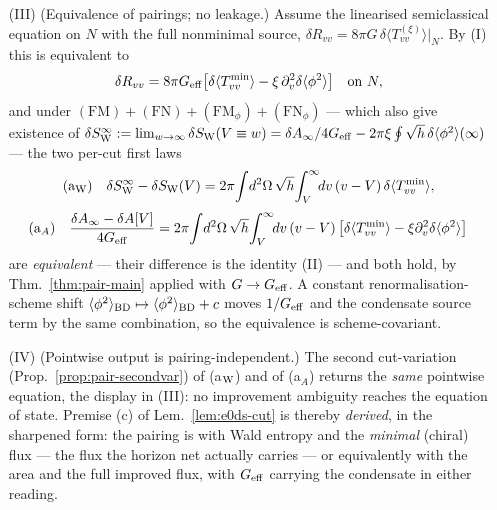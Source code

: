 \begin{lemma}
\begin{enumerate}
vanishing weight, the far term is killed by
$(\mathrm{FM}_{\phi})+(\mathrm{FN}_{\phi})$. The improvement
contribution to the weighted flux,
$2\pi\xi\oint\sqrt h\,[\delta\langle\phi^{2}\rangle(\infty)
-\delta\langle\phi^{2}\rangle(V)]$, is therefore cut-localised ---
nothing is left on the horizon bulk --- and cancels \emph{exactly}
against the $\xi$-piece of the Wald-entropy deficit,
$\delta S^{(\xi)}(\infty)-\delta S^{(\xi)}(V)
=2\pi\xi\oint\sqrt h\,[\delta\langle\phi^{2}\rangle(V)
-\delta\langle\phi^{2}\rangle(\infty)]$ with
$\delta S^{(\xi)}(V):=-2\pi\xi\oint\sqrt h\,\delta\langle\phi^{2}
\rangle(V)$, when moved across the first law: this is the improvement-identity
surface-term statement, made sign-explicit.
\item[(III)] (Equivalence of pairings; no leakage.) Assume the
linearised semiclassical equation on $N$ with the full nonminimal
source, $\delta R_{vv}=8\pi G\,\delta\langle T^{(\xi)}_{vv}\rangle
|_{N}$. By (I) this is equivalent to
\[
\delta R_{vv}
=8\pi G_{\rm eff}\bigl[\delta\langle T^{\rm min}_{vv}\rangle
-\xi\,\partial_{v}^{2}\delta\langle\phi^{2}\rangle\bigr]\quad
\text{on }N,
\]
and under $(\mathrm{FM})+(\mathrm{FN})+(\mathrm{FM}_{\phi})
+(\mathrm{FN}_{\phi})$ --- which also give existence of
$\delta S_{\rm W}^{\infty}:=\lim_{w\to\infty}\delta S_{\rm W}
(V\equiv w)=\delta A_{\infty}/4G_{\rm eff}-2\pi\xi\oint\sqrt h\,
\delta\langle\phi^{2}\rangle(\infty)$ --- the two per-cut first laws
\[
\text{(a$_{\rm W}$)}\quad
\delta S_{\rm W}^{\infty}-\delta S_{\rm W}(V)
=2\pi\!\int\!d^{2}\Omega\,\sqrt h\!\int_{V}^{\infty}\!\!dv\,(v-V)\,
\delta\langle T^{\rm min}_{vv}\rangle,
\]
\[
\text{(a$_{A}$)}\quad
\frac{\delta A_{\infty}-\delta A[V]}{4G_{\rm eff}}
=2\pi\!\int\!d^{2}\Omega\,\sqrt h\!\int_{V}^{\infty}\!\!dv\,(v-V)\,
\bigl[\delta\langle T^{\rm min}_{vv}\rangle
-\xi\partial_{v}^{2}\delta\langle\phi^{2}\rangle\bigr]
\]
are \emph{equivalent} --- their difference is the identity (II) ---
and both hold, by Thm.~\ref{thm:pair-main} applied with
$G\to G_{\rm eff}$. A constant renormalisation-scheme shift
$\langle\phi^{2}\rangle_{\rm BD}\mapsto\langle\phi^{2}\rangle_{\rm BD}
+c$ moves $1/G_{\rm eff}$ and the condensate source term by the same
combination, so the equivalence is scheme-covariant.
\item[(IV)] (Pointwise output is pairing-independent.) The second
cut-variation (Prop.~\ref{prop:pair-secondvar}) of (a$_{\rm W}$) and
of (a$_{A}$) returns the \emph{same} pointwise equation, the display
in (III): no improvement ambiguity reaches the equation of state.
Premise (c) of Lem.~\ref{lem:e0ds-cut} is thereby \emph{derived}, in
the sharpened form: the pairing is with Wald entropy and the
\emph{minimal} (chiral) flux --- the flux the horizon net actually
carries --- or equivalently with the area and the full improved flux,
with $G_{\rm eff}$ carrying the condensate in either reading.
\end{enumerate}
\end{lemma}

